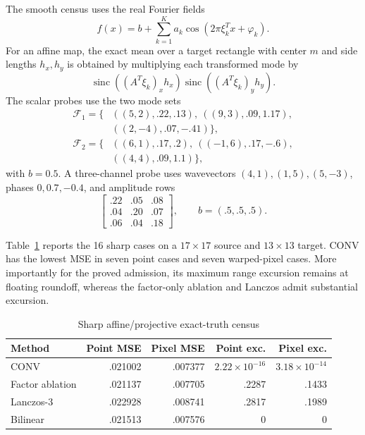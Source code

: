 \documentclass[journal]{IEEEtran}
\begin{document}
The smooth census uses the real Fourier fields
\begin{equation}
 f(x)=b+\sum_{k=1}^Ka_k
 \cos\!\left(2\pi\xi_k^Tx+\varphi_k\right).
 \label{eq:warpfourierfield}
\end{equation}
For an affine map, the exact mean over a target rectangle with center \(m\)
and side lengths \(h_x,h_y\) is obtained by multiplying each transformed
mode by
\begin{equation}
 \operatorname{sinc}((A^T\xi_k)_xh_x)
 \operatorname{sinc}((A^T\xi_k)_yh_y).
 \label{eq:warpfouriermean}
\end{equation}
The scalar probes use the two mode sets
\begin{equation}
\begin{aligned}
 \mathcal F_1=\{&((5,2),.22,.13),\ ((9,3),.09,1.17),\\
                &((2,-4),.07,-.41)\},\\
 \mathcal F_2=\{&((6,1),.17,.2),\ ((-1,6),.17,-.6),\\
                &((4,4),.09,1.1)\},
\end{aligned}
\label{eq:warpfourierprobes}
\end{equation}
with \(b=0.5\).  A three-channel probe uses wavevectors
\((4,1),(1,5),(5,-3)\), phases \(0,0.7,-0.4\), and amplitude rows
\begin{equation}
 \begin{bmatrix}.22&.05&.08\\.04&.20&.07\\.06&.04&.18\end{bmatrix},
 \qquad b=(.5,.5,.5).
 \label{eq:warpmultichannelprobe}
\end{equation}

Table~\ref{tab:warpsharp} reports the 16 sharp cases on a
\(17\times17\) source and \(13\times13\) target.  CONV has the lowest MSE in
seven point cases and seven warped-pixel cases.  More importantly for the
proved admission, its maximum range excursion remains at floating roundoff,
whereas the factor-only ablation and Lanczos admit substantial excursion.

\begin{table}[H]
\caption{Sharp affine/projective exact-truth census}
\label{tab:warpsharp}
\centering
\scriptsize
\setlength{\tabcolsep}{2.0pt}
\begin{tabular}{lrrrr}
\hline
Method & Point MSE & Pixel MSE & Point exc. & Pixel exc.\\
\hline
CONV & .021002 & .007377 & \(2.22\!\times\!10^{-16}\) & \(3.18\!\times\!10^{-14}\)\\
Factor ablation & .021137 & .007705 & .2287 & .1433\\
Lanczos-3 & .022928 & .008741 & .2817 & .1989\\
Bilinear & .021513 & .007576 & 0 & 0\\
\hline
\end{tabular}
\end{table}
\end{document}
